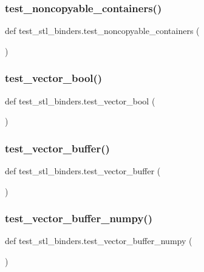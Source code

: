 \subsubsection{\texorpdfstring{test\_noncopyable\_containers()}{test\_noncopyable\_containers()}}
{\footnotesize\ttfamily def test\+\_\+stl\+\_\+binders.\+test\+\_\+noncopyable\+\_\+containers (\begin{DoxyParamCaption}{ }\end{DoxyParamCaption})}

\mbox{\label{namespacetest__stl__binders_ae2d1291022ad7148c668995272f96480}} 
\subsubsection{\texorpdfstring{test\_vector\_bool()}{test\_vector\_bool()}}
{\footnotesize\ttfamily def test\+\_\+stl\+\_\+binders.\+test\+\_\+vector\+\_\+bool (\begin{DoxyParamCaption}{ }\end{DoxyParamCaption})}

\mbox{\label{namespacetest__stl__binders_ae7ac283e0a254858fcdd95ad51da8fcc}} 
\subsubsection{\texorpdfstring{test\_vector\_buffer()}{test\_vector\_buffer()}}
{\footnotesize\ttfamily def test\+\_\+stl\+\_\+binders.\+test\+\_\+vector\+\_\+buffer (\begin{DoxyParamCaption}{ }\end{DoxyParamCaption})}

\mbox{\label{namespacetest__stl__binders_a4791eb20d21f8187d264a0a223f9a39b}} 
\subsubsection{\texorpdfstring{test\_vector\_buffer\_numpy()}{test\_vector\_buffer\_numpy()}}
{\footnotesize\ttfamily def test\+\_\+stl\+\_\+binders.\+test\+\_\+vector\+\_\+buffer\+\_\+numpy (\begin{DoxyParamCaption}{ }\end{DoxyParamCaption})}

